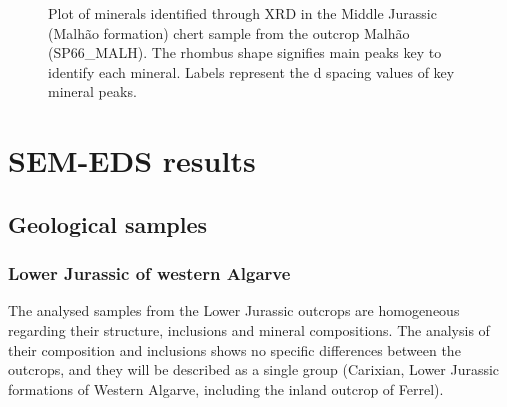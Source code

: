 \documentclass[
  a4paper,
  DIV=11,
  numbers=noendperiod]{scrreprt}
\begin{document}
\begin{figure}


\caption{\label{fig-xrd-sp66}Plot of minerals identified through XRD in
the Middle Jurassic (Malhão formation) chert sample from the outcrop
Malhão (SP66\_MALH). The rhombus shape signifies main peaks key to
identify each mineral. Labels represent the d spacing values of key
mineral peaks.}

\end{figure}%

\section{SEM-EDS results}\label{sem-eds-results}

\subsection{Geological samples}\label{geological-samples}

\subsubsection{Lower Jurassic of western
Algarve}\label{lower-jurassic-of-western-algarve}

The analysed samples from the Lower Jurassic outcrops are homogeneous
regarding their structure, inclusions and mineral compositions. The
analysis of their composition and inclusions shows no specific
differences between the outcrops, and they will be described as a single
group (Carixian, Lower Jurassic formations of Western Algarve, including
the inland outcrop of Ferrel).
\end{document}
